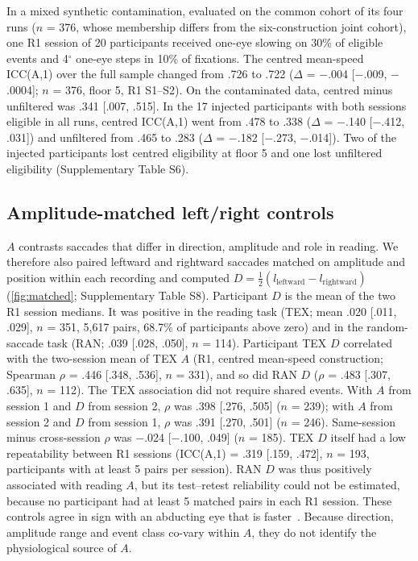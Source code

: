 In a mixed synthetic contamination, evaluated on the common cohort of its four runs ($n$ = 376, whose membership differs from the six-construction joint cohort), one R1 session of 20 participants received one-eye slowing on 30\% of eligible events and 4$^\circ$ one-eye steps in 10\% of fixations. The centred mean-speed ICC(A,1) over the full sample changed from .726 to .722 ($\Delta$ = $-$.004 [$-$.009, $-$.0004]; $n$ = 376, floor 5, R1 S1--S2). On the contaminated data, centred minus unfiltered was .341 [.007, .515]. In the 17 injected participants with both sessions eligible in all runs, centred ICC(A,1) went from .478 to .338 ($\Delta$ = $-$.140 [$-$.412, .031]) and unfiltered from .465 to .283 ($\Delta$ = $-$.182 [$-$.273, $-$.014]). Two of the injected participants lost centred eligibility at floor 5 and one lost unfiltered eligibility (Supplementary Table S6).

\subsection{Amplitude-matched left/right controls}

$A$ contrasts saccades that differ in direction, amplitude and role in reading. We therefore also paired leftward and rightward saccades matched on amplitude and position within each recording and computed $D = \tfrac12(l_{\mathrm{leftward}} - l_{\mathrm{rightward}})$ (\cref{fig:matched}; Supplementary Table S8). Participant $D$ is the mean of the two R1 session medians. It was positive in the reading task (TEX; mean .020 [.011, .029], $n$ = 351, 5,617 pairs, 68.7\% of participants above zero) and in the random-saccade task (RAN; .039 [.028, .050], $n$ = 114). Participant TEX $D$ correlated with the two-session mean of TEX $A$ (R1, centred mean-speed construction; Spearman $\rho$ = .446 [.348, .536], $n$ = 331), and so did RAN $D$ ($\rho$ = .483 [.307, .635], $n$ = 112). The TEX association did not require shared events. With $A$ from session 1 and $D$ from session 2, $\rho$ was .398 [.276, .505] ($n$ = 239); with $A$ from session 2 and $D$ from session 1, $\rho$ was .391 [.270, .501] ($n$ = 246). Same-session minus cross-session $\rho$ was $-$.024 [$-$.100, .049] ($n$ = 185). TEX $D$ itself had a low repeatability between R1 sessions (ICC(A,1) = .319 [.159, .472], $n$ = 193, participants with at least 5 pairs per session). RAN $D$ was thus positively associated with reading $A$, but its test--retest reliability could not be estimated, because no participant had at least 5 matched pairs in each R1 session. These controls agree in sign with an abducting eye that is faster~\citep{collewijn1988}. Because direction, amplitude range and event class co-vary within $A$, they do not identify the physiological source of $A$.

